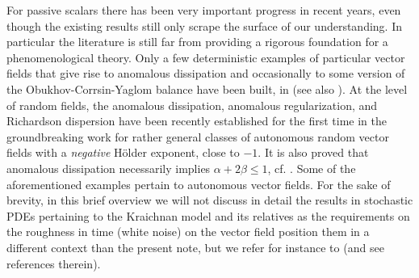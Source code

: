 \documentclass[11pt,reqno]{amsart}
\theoremstyle{definition}
\numberwithin{equation}{section}
\begin{document}
For passive scalars there has been very important progress in recent years, even though the existing results still only scrape the surface of our understanding. In particular the literature is still far from providing a rigorous foundation for a phenomenological theory. Only a few deterministic examples of particular vector fields that give rise to anomalous dissipation and occasionally to some version of the Obukhov-Corrsin-Yaglom balance have been built, in \cite{DrivasElgindiIyerJeong2019,BrueDeLellis2023,ColomboCrippaSorella2023,JohanssonSorella2023,JohanssonSorella2024,BrueColomboCrippaDeLellisSorella2024,ArmstrongVicol2024,ElgindiLiss2024,BurczakSzekelyhidiWu2023} (see also \cite{HuysmansTiti2025}). At the level of random fields, the anomalous dissipation, anomalous regularization, and Richardson dispersion have been recently established for the first time in the groundbreaking work \cite{ArmstrongBouRabeeKuusi2026} for rather general classes of autonomous random vector fields with a {\it negative} H\"older exponent, close to $-1$. It is also proved that anomalous dissipation necessarily implies $\alpha + 2\beta \leq 1$, cf. \cite{DrivasElgindiIyerJeong2019,AkramovWiedemann2019}. Some of the aforementioned examples pertain to autonomous vector fields. For the sake of brevity, in this brief overview we will not discuss in detail the results in stochastic PDEs pertaining to the Kraichnan model and its relatives as the requirements on the roughness in time (white noise) on the vector field position them in a different context than the present note, but we refer for instance to \cite{BagnaraGrottoMaurelli2024,BernardGawedzkiKupiainen1998,DrivasGaleatiPappalettera2025,EyinkXin2000,GaleatiGrottoMaurelli2024,LeJanRaimond2004,Rowan2024,Rowan2025} (and see references therein).
\end{document}
